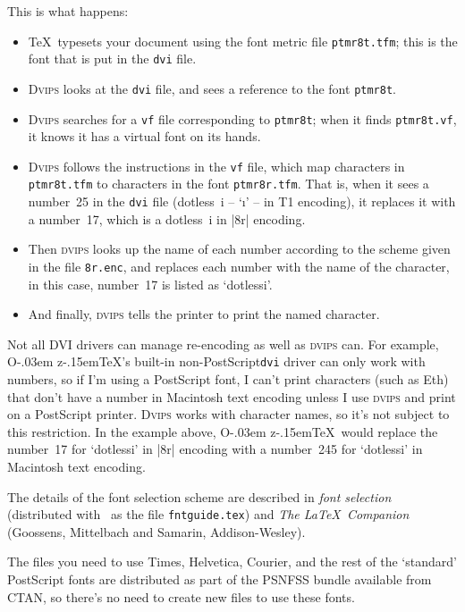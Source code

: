 \documentclass[a4paper]{ltxguide}
\newcommand*{\OzTeX}{O\kern-.03em z\kern-.15em\TeX}
\newcommand{\PS}{Post\-Script\xspace}
\newcommand*{\setfilename}[1]{\texttt{#1}}
\newcommand*{\setpackagename}[1]{\textsc{#1}}
\newcommand{\dvips}   {\setpackagename{dvips}\xspace}
\newcommand{\Dvips}   {\setpackagename{Dvips}\xspace}
\newcommand{\vf} {\setfilename{vf}\xspace}
\newcommand{\dvi}{\setfilename{dvi}\xspace}
\begin{document}
This is what happens:
\begin{itemize}
\item \TeX\ typesets your document using the font metric file
  \texttt{ptmr8t.tfm}; this is the font that is put in the \dvi
  file.
\item \Dvips looks at the \dvi file, and sees a reference to the
  font \texttt{ptmr8t}.
\item \Dvips searches for a \vf file corresponding to
  \texttt{ptmr8t}; when it finds \texttt{ptmr8t.vf}, it knows it
  has a virtual font on its hands.
\item \Dvips follows the instructions in the \vf file, which map
  characters in \texttt{ptmr8t.tfm} to characters in the font
  \texttt{ptmr8r.tfm}.  That is, when it sees a number~25 in the
  \dvi file (dotless~i -- `\i' -- in T1 encoding), it replaces it
  with a number~17, which is a dotless~i in |8r| encoding.
\item Then \dvips looks up the name of each number according to
  the scheme given in the file \texttt{8r.enc}, and replaces each
  number with the name of the character, in this case, number~17
  is listed as `dotlessi'.
\item And finally, \dvips tells the printer to print the named
  character.
\end{itemize}

Not all DVI drivers can manage re-encoding as well as \dvips can.
For example, \OzTeX's built-in non-\PS \dvi driver can only work
with numbers, so if I'm using a \PS font, I can't print characters
(such as Eth) that don't have a number in Macintosh text encoding
unless I use \dvips and print on a \PS printer.  \Dvips works with
character names, so it's not subject to this restriction.  In the
example above, \OzTeX\ would replace the number~17 for `dotlessi'
in |8r| encoding with a number~245 for `dotlessi' in Macintosh
text encoding.

The details of the \LaTeXe{} font selection scheme are described
in \emph{\LaTeXe{} font selection} (distributed with \LaTeXe\ as
the file \texttt{fntguide.tex}) and \emph{The \LaTeX\ Companion}
(Goossens, Mittelbach and Samarin, Addison-Wesley).

The files you need to use Times, Helvetica, Courier, and the rest
of the `standard' \PS fonts are distributed as part of the
\setpackagename{PSNFSS} bundle available from CTAN, so there's no
need to create new files to use these fonts.
\end{document}

